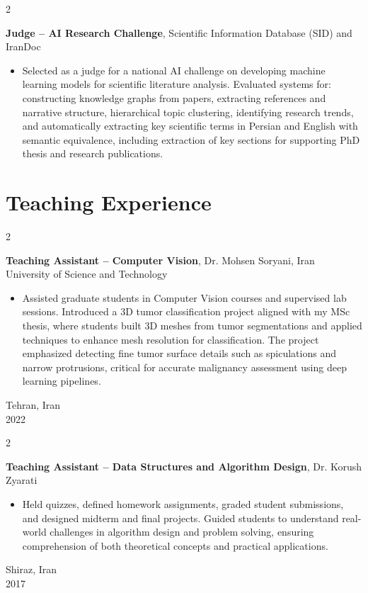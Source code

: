 \documentclass[10pt, letterpaper]{article}
\newenvironment{highlights}{
    \begin{itemize}[
        topsep=0.10 cm,
        parsep=0.10 cm,
        partopsep=0pt,
        itemsep=0pt,
        leftmargin=0.4 cm + 10pt
    ]
}{
    \end{itemize}
}
\newenvironment{twocolentry}[2][]{
    \onecolentry
    \def\secondColumn{#2}
    \setcolumnwidth{\fill, 4.5 cm}
    \begin{paracol}{2}
}{
    \switchcolumn \raggedleft \secondColumn
    \end{paracol}
    \endonecolentry
}
\begin{document}
    \begin{twocolentry}{2026}
        \textbf{Judge -- AI Research Challenge}, Scientific Information Database (SID) and IranDoc
        \begin{highlights}
            \item Selected as a judge for a national AI challenge on developing machine learning models for scientific literature analysis. Evaluated systems for: constructing knowledge graphs from papers, extracting references and narrative structure, hierarchical topic clustering, identifying research trends, and automatically extracting key scientific terms in Persian and English with semantic equivalence, including extraction of key sections for supporting PhD thesis and research publications.
        \end{highlights}
    \end{twocolentry}

    \section{Teaching Experience}
    \begin{twocolentry}{Tehran, Iran \\ 2022}
        \textbf{Teaching Assistant -- Computer Vision}, Dr. Mohsen Soryani, Iran University of Science and Technology
        \begin{highlights}
            \item Assisted graduate students in Computer Vision courses and supervised lab sessions. Introduced a 3D tumor classification project aligned with my MSc thesis, where students built 3D meshes from tumor segmentations and applied techniques to enhance mesh resolution for classification. The project emphasized detecting fine tumor surface details such as spiculations and narrow protrusions, critical for accurate malignancy assessment using deep learning pipelines.
        \end{highlights}
    \end{twocolentry}

    \begin{twocolentry}{Shiraz, Iran \\ 2017}
        \textbf{Teaching Assistant -- Data Structures and Algorithm Design}, Dr. Korush Zyarati
        \begin{highlights}
            \item Held quizzes, defined homework assignments, graded student submissions, and designed midterm and final projects. Guided students to understand real-world challenges in algorithm design and problem solving, ensuring comprehension of both theoretical concepts and practical applications.
        \end{highlights}
    \end{twocolentry}
\end{document}
